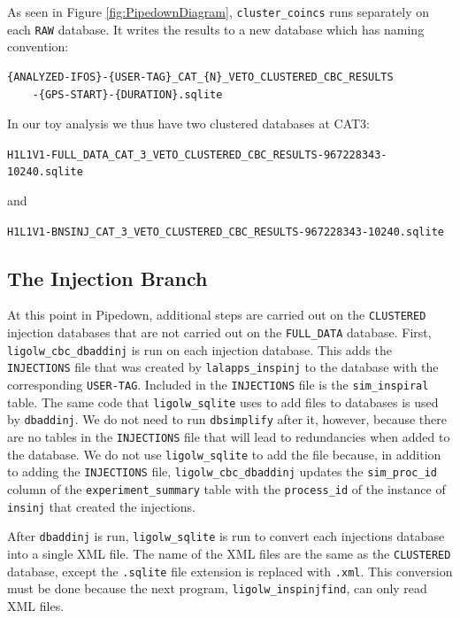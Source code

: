 As seen in Figure \ref{fig:PipedownDiagram}, \verb|cluster_coincs| runs
separately on each \verb|RAW| database. It writes the results to a new database
which has naming convention:
\begin{center}
\begin{verbatim}
{ANALYZED-IFOS}-{USER-TAG}_CAT_{N}_VETO_CLUSTERED_CBC_RESULTS
    -{GPS-START}-{DURATION}.sqlite
\end{verbatim}
\end{center}
In our toy analysis we thus have two clustered databases at CAT3:
\begin{footnotesize}
\begin{center}
\verb|H1L1V1-FULL_DATA_CAT_3_VETO_CLUSTERED_CBC_RESULTS-967228343-10240.sqlite|
\end{center}
\end{footnotesize}
and
\begin{center}
\begin{footnotesize}
\verb|H1L1V1-BNSINJ_CAT_3_VETO_CLUSTERED_CBC_RESULTS-967228343-10240.sqlite|
\end{footnotesize}
\end{center}

\subsection{The Injection Branch}
\label{sec:Pipedown-injBranch}

At this point in Pipedown, additional steps are carried out on the
\verb|CLUSTERED| injection databases that are not carried out on the
\verb|FULL_DATA| database. First, \verb|ligolw_cbc_dbaddinj| is run on each
injection database. This adds the \verb|INJECTIONS| file that was created by
\verb|lalapps_inspinj| to the database with the corresponding \verb|USER-TAG|.
Included in the \verb|INJECTIONS| file is the \verb|sim_inspiral| table. The
same code that \verb|ligolw_sqlite| uses to add files to databases is used by
\verb|dbaddinj|. We do not need to run \verb|dbsimplify| after it, however,
because there are no tables in the \verb|INJECTIONS| file that will lead to
redundancies when added to the database. We do not use \verb|ligolw_sqlite| to
add the file because, in addition to adding the \verb|INJECTIONS| file,
\verb|ligolw_cbc_dbaddinj| updates the \verb|sim_proc_id| column of the
\verb|experiment_summary| table with the \verb|process_id| of the instance of
\verb|insinj| that created the injections.

After \verb|dbaddinj| is run, \verb|ligolw_sqlite| is run to convert each
injections database into a single XML file. The name of the XML files are the
same as the \verb|CLUSTERED| database, except the \verb|.sqlite| file extension
is replaced with \verb|.xml|. This conversion must be done because the next
program, \verb|ligolw_inspinjfind|, can only read XML files.

